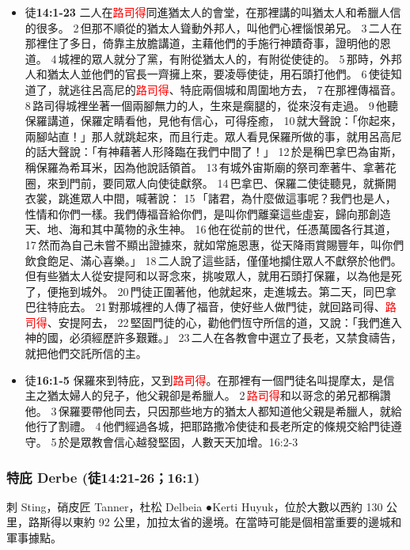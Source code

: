 \begin{itemize}
\itemsep-.25em 
\item 徒\textbf{14:1-23} 二人在\textcolor{red}{路司得}同進猶太人的會堂，在那裡講的叫猶太人和希臘人信的很多。 2 但那不順從的猶太人聳動外邦人，叫他們心裡惱恨弟兄。 3 二人在那裡住了多日，倚靠主放膽講道，主藉他們的手施行神蹟奇事，證明他的恩道。 4 城裡的眾人就分了黨，有附從猶太人的，有附從使徒的。 5 那時，外邦人和猶太人並他們的官長一齊擁上來，要凌辱使徒，用石頭打他們。 6 使徒知道了，就逃往呂高尼的\textcolor{red}{路司得}、特庇兩個城和周圍地方去， 7 在那裡傳福音。8 路司得城裡坐著一個兩腳無力的人，生來是瘸腿的，從來沒有走過。 9 他聽保羅講道，保羅定睛看他，見他有信心，可得痊癒， 10 就大聲說：「你起來，兩腳站直！」那人就跳起來，而且行走。眾人看見保羅所做的事，就用呂高尼的話大聲說：「有神藉著人形降臨在我們中間了！」 12 於是稱巴拿巴為宙斯，稱保羅為希耳米，因為他說話領首。 13 有城外宙斯廟的祭司牽著牛、拿著花圈，來到門前，要同眾人向使徒獻祭。 14 巴拿巴、保羅二使徒聽見，就撕開衣裳，跳進眾人中間，喊著說： 15 「諸君，為什麼做這事呢？我們也是人，性情和你們一樣。我們傳福音給你們，是叫你們離棄這些虛妄，歸向那創造天、地、海和其中萬物的永生神。 16 他在從前的世代，任憑萬國各行其道， 17 然而為自己未嘗不顯出證據來，就如常施恩惠，從天降雨賞賜豐年，叫你們飲食飽足、滿心喜樂。」 18 二人說了這些話，僅僅地攔住眾人不獻祭於他們。但有些猶太人從安提阿和以哥念來，挑唆眾人，就用石頭打保羅，以為他是死了，便拖到城外。 20 門徒正圍著他，他就起來，走進城去。第二天，同巴拿巴往特庇去。 21 對那城裡的人傳了福音，使好些人做門徒，就回路司得、\textcolor{red}{路司得}、安提阿去， 22 堅固門徒的心，勸他們恆守所信的道，又說：「我們進入神的國，必須經歷許多艱難。」 23 二人在各教會中選立了長老，又禁食禱告，就把他們交託所信的主。

\item 徒\textbf{16:1-5} 保羅來到特庇，又到\textcolor{red}{路司得}。在那裡有一個門徒名叫提摩太，是信主之猶太婦人的兒子，他父親卻是希臘人。 2 \textcolor{red}{路司得}和以哥念的弟兄都稱讚他。 3 保羅要帶他同去，只因那些地方的猶太人都知道他父親是希臘人，就給他行了割禮。 4 他們經過各城，把耶路撒冷使徒和長老所定的條規交給門徒遵守。 5 於是眾教會信心越發堅固，人數天天加增。16:2-3
\end{itemize}


\subsubsection{特庇 Derbe  (徒14:21-26；16:1)}

刺 Sting，硝皮匠 Tanner，杜松 Delbeia
●Kerti Huyuk，位於大數以西約 130 公里，路斯得以東約 92 公里，加拉太省的邊境。在當時可能是個相當重要的邊城和軍事據點。



